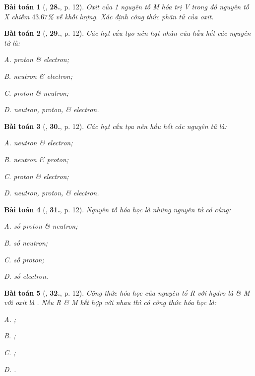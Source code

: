 \documentclass{article}
\numberwithin{equation}{section}
\newtheorem{baitoan}{Bài toán}[section]
\begin{document}
\begin{baitoan}[\cite{An2011}, \textbf{28.}, p. 12]
	Oxit của 1 nguyên tố M hóa trị V trong đó nguyên tố X chiếm $43.67$\% về khối lượng. Xác định công thức phân tử của oxit.
\end{baitoan}

\begin{baitoan}[\cite{An2011}, \textbf{29.}, p. 12]
	Các hạt cấu tạo nên hạt nhân của hầu hết các nguyên tử là:
	\begin{enumerate*}
		\item[{\rm\sf A.}] proton \& electron;
		\item[{\rm\sf B.}] neutron \& electron;
		\item[{\rm\sf C.}] proton \& neutron;
		\item[{\rm\sf D.}] neutron, proton, \& electron.
	\end{enumerate*}
\end{baitoan}

\begin{baitoan}[\cite{An2011}, \textbf{30.}, p. 12]
	Các hạt cấu tọa nên hầu hết các nguyên tử là:
	\begin{enumerate*}
		\item[{\rm\sf A.}] neutron \& electron;
		\item[{\rm\sf B.}] neutron \& proton;
		\item[{\rm\sf C.}] proton \& electron;
		\item[{\rm\sf D.}] neutron, proton, \& electron.
	\end{enumerate*}
\end{baitoan}

\begin{baitoan}[\cite{An2011}, \textbf{31.}, p. 12]
	Nguyên tố hóa học là những nguyên tử có cùng:
	\begin{enumerate*}
		\item[{\rm\sf A.}] số proton \& neutron;
		\item[{\rm\sf B.}] số neutron;
		\item[{\rm\sf C.}] số proton;
		\item[{\rm\sf D.}] số electron.
	\end{enumerate*}
\end{baitoan}

\begin{baitoan}[\cite{An2011}, \textbf{32.}, p. 12]
	Công thức hóa học của nguyên tố R với hydro là  \& M với oxit là . Nếu R \& M kết hợp với nhau thì có công thức hóa học là:
	\begin{enumerate*}
		\item[{\rm\sf A.}] ;
		\item[{\rm\sf B.}] ;
		\item[{\rm\sf C.}] ;
		\item[{\rm\sf D.}] .
	\end{enumerate*}
\end{baitoan}
\end{document}
